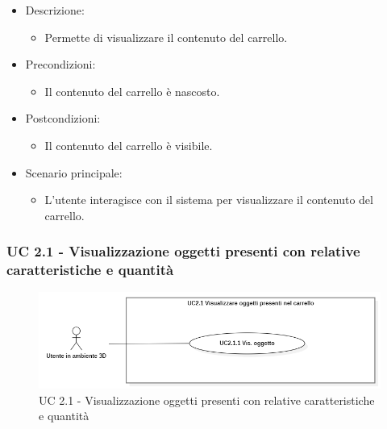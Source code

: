 \begin{itemize}
	
	\item Descrizione:
	\begin{itemize}
		\item Permette di visualizzare il contenuto del carrello.
	\end{itemize}
	
	\item Precondizioni:
	\begin{itemize}
		\item Il contenuto del carrello è nascosto.
	\end{itemize}
	
	\item Postcondizioni:
	\begin{itemize}
		\item Il contenuto del carrello è visibile.
	\end{itemize}
	
	\item Scenario principale:
	\begin{itemize}
		\item L'utente interagisce con il sistema per visualizzare il contenuto del carrello.
	\end{itemize}
	
\end{itemize}

\subsubsection{UC 2.1 - Visualizzazione oggetti presenti con relative caratteristiche e quantità}

\begin{figure}[H]
  \renewcommand{\thefigure}{3}
  \includegraphics[width=\linewidth]{./res/images/UC2.1.png}
  \caption{UC 2.1 - Visualizzazione oggetti presenti con relative caratteristiche e quantità}
  \label{fig:UC 2.1}
\end{figure}

